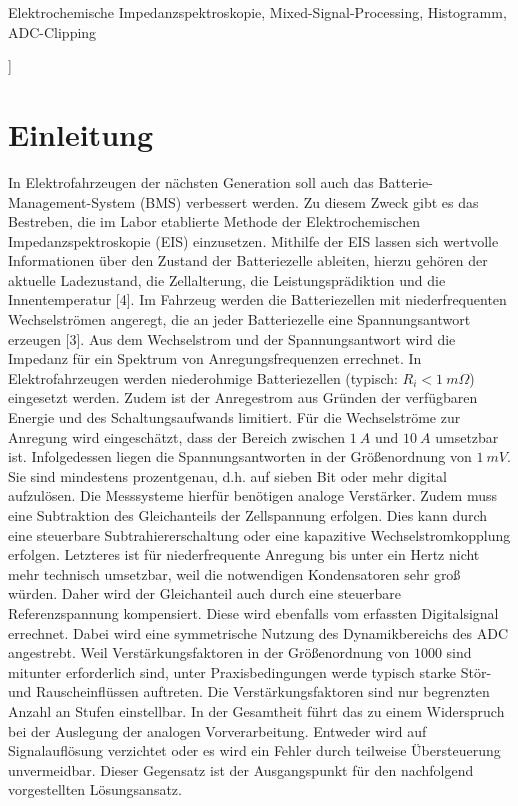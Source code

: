 	\vspace{.5em}
	\begin{IEEEkeywords}
		\fontsize{10pt}{12pt}\selectfont
		\normalfont Elektrochemische Impedanzspektroskopie, Mixed-Signal-Processing, Histogramm, ADC-Clipping
	\end{IEEEkeywords} 
	\vspace{3em}
	] 
\graphicspath{{./BILDER}}
\section{Einleitung}	

In Elektrofahrzeugen der nächsten Generation soll auch das Batterie-Management-System (BMS) verbessert werden. Zu diesem Zweck gibt es das Bestreben, die im Labor etablierte Methode der Elektrochemischen Impedanzspektroskopie (EIS) einzusetzen. Mithilfe der EIS lassen sich wertvolle Informationen über den Zustand der Batteriezelle ableiten, hierzu gehören der aktuelle Ladezustand, die Zellalterung, die Leistungsprädiktion und die Innentemperatur [4]. Im Fahrzeug werden die Batteriezellen mit niederfrequenten Wechselströmen angeregt, die an jeder Batteriezelle eine Spannungsantwort erzeugen [3]. Aus dem Wechselstrom und der Spannungsantwort wird die Impedanz für ein Spektrum von Anregungsfrequenzen errechnet. In Elektrofahrzeugen werden niederohmige Batteriezellen (typisch: $R_i < \SI{1}{m\Omega}$) eingesetzt werden. Zudem ist der Anregestrom aus Gründen der verfügbaren Energie und des Schaltungsaufwands limitiert. Für die Wechselströme zur Anregung wird eingeschätzt, dass der Bereich zwischen $\SI{1}{A}$ und $\SI{10}{A}$ umsetzbar ist. Infolgedessen liegen die Spannungsantworten in der Größenordnung  von $\SI{1}{mV}$. Sie sind mindestens prozentgenau, d.h. auf sieben Bit oder mehr digital aufzulösen. Die Messsysteme hierfür benötigen analoge Verstärker. Zudem muss eine Subtraktion des Gleichanteils der Zellspannung erfolgen. Dies kann durch eine steuerbare Subtrahiererschaltung oder eine kapazitive Wechselstromkopplung erfolgen. Letzteres ist für niederfrequente Anregung bis unter ein Hertz nicht mehr technisch umsetzbar, weil die notwendigen Kondensatoren sehr groß würden. Daher wird der Gleichanteil auch durch eine steuerbare Referenzspannung kompensiert. Diese wird ebenfalls vom erfassten Digitalsignal errechnet. Dabei wird eine symmetrische Nutzung des Dynamikbereichs des ADC angestrebt. 
Weil Verstärkungsfaktoren in der Größenordnung von $1000$ sind mitunter erforderlich sind, unter Praxisbedingungen werde typisch starke Stör- und Rauscheinflüssen auftreten. Die Verstärkungsfaktoren sind nur begrenzten Anzahl an Stufen einstellbar. In der Gesamtheit führt das zu einem Widerspruch bei der Auslegung der analogen Vorverarbeitung. Entweder wird auf Signalauflösung verzichtet oder es wird ein Fehler durch teilweise Übersteuerung unvermeidbar. Dieser Gegensatz ist der Ausgangspunkt für den nachfolgend vorgestellten Lösungsansatz.


